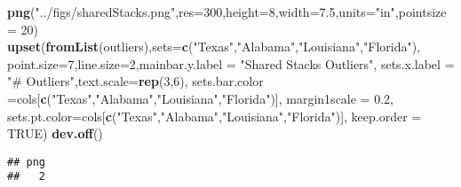 \documentclass[11pt,]{article}
\newenvironment{Shaded}{\begin{snugshade}}{\end{snugshade}}
\newcommand{\KeywordTok}[1]{\textcolor[rgb]{0.13,0.29,0.53}{\textbf{#1}}}
\newcommand{\DataTypeTok}[1]{\textcolor[rgb]{0.13,0.29,0.53}{#1}}
\newcommand{\DecValTok}[1]{\textcolor[rgb]{0.00,0.00,0.81}{#1}}
\newcommand{\FloatTok}[1]{\textcolor[rgb]{0.00,0.00,0.81}{#1}}
\newcommand{\StringTok}[1]{\textcolor[rgb]{0.31,0.60,0.02}{#1}}
\newcommand{\OtherTok}[1]{\textcolor[rgb]{0.56,0.35,0.01}{#1}}
\newcommand{\NormalTok}[1]{#1}
\begin{document}
\begin{Shaded}
\begin{Highlighting}[]
\KeywordTok{png}\NormalTok{(}\StringTok{"../figs/sharedStacks.png"}\NormalTok{,}\DataTypeTok{res=}\DecValTok{300}\NormalTok{,}\DataTypeTok{height=}\DecValTok{8}\NormalTok{,}\DataTypeTok{width=}\FloatTok{7.5}\NormalTok{,}\DataTypeTok{units=}\StringTok{"in"}\NormalTok{,}\DataTypeTok{pointsize =} \DecValTok{20}\NormalTok{)}
\KeywordTok{upset}\NormalTok{(}\KeywordTok{fromList}\NormalTok{(outliers),}\DataTypeTok{sets=}\KeywordTok{c}\NormalTok{(}\StringTok{"Texas"}\NormalTok{,}\StringTok{"Alabama"}\NormalTok{,}\StringTok{"Louisiana"}\NormalTok{,}\StringTok{"Florida"}\NormalTok{),}
      \DataTypeTok{point.size=}\DecValTok{7}\NormalTok{,}\DataTypeTok{line.size=}\DecValTok{2}\NormalTok{,}\DataTypeTok{mainbar.y.label =} \StringTok{"Shared Stacks Outliers"}\NormalTok{,}
      \DataTypeTok{sets.x.label =} \StringTok{"# Outliers"}\NormalTok{,}\DataTypeTok{text.scale=}\KeywordTok{rep}\NormalTok{(}\DecValTok{3}\NormalTok{,}\DecValTok{6}\NormalTok{),}
      \DataTypeTok{sets.bar.color =}\NormalTok{cols[}\KeywordTok{c}\NormalTok{(}\StringTok{"Texas"}\NormalTok{,}\StringTok{"Alabama"}\NormalTok{,}\StringTok{"Louisiana"}\NormalTok{,}\StringTok{"Florida"}\NormalTok{)],}
      \DataTypeTok{margin1scale =} \FloatTok{0.2}\NormalTok{,}
      \DataTypeTok{sets.pt.color=}\NormalTok{cols[}\KeywordTok{c}\NormalTok{(}\StringTok{"Texas"}\NormalTok{,}\StringTok{"Alabama"}\NormalTok{,}\StringTok{"Louisiana"}\NormalTok{,}\StringTok{"Florida"}\NormalTok{)],}
      \DataTypeTok{keep.order =} \OtherTok{TRUE}\NormalTok{)}
\KeywordTok{dev.off}\NormalTok{()}
\end{Highlighting}
\end{Shaded}

\begin{verbatim}
## png 
##   2
\end{verbatim}
\end{document}
